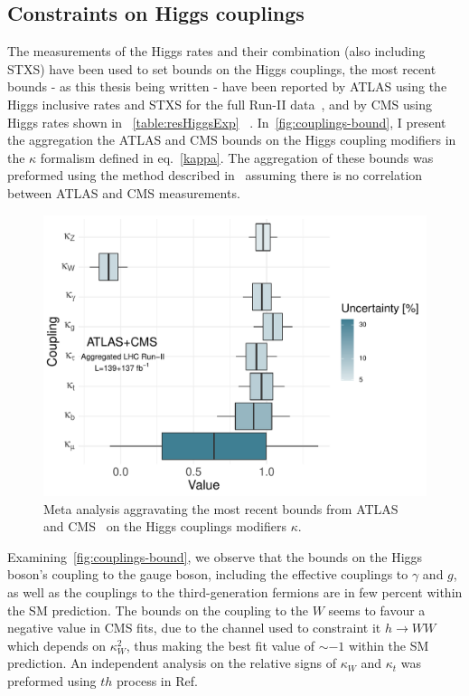 \subsection{Constraints on Higgs couplings}
The measurements of the Higgs rates and their combination (also including STXS) have been used to set bounds on the Higgs couplings, the most recent bounds - as this thesis being written - have been reported by ATLAS using the Higgs inclusive rates and STXS for the full Run-II data~\cite{ATLAS2021vrm}, and  by CMS using Higgs rates shown in ~\autoref{table:resHiggsExp} ~\cite{CMS:2020gsy}. In~\autoref{fig:couplings-bound}, I present the aggregation the ATLAS and CMS bounds on the Higgs coupling modifiers in the $\kappa$ formalism defined in eq.~\eqref{kappa}. The aggregation of these bounds was preformed using the method described in~\cite{BHHR} assuming there is no correlation between ATLAS and CMS measurements.  
\begin{figure}[htb!]
	\begin{center}
		\includegraphics[height=0.35\textheight]{figures/agg_higgs_couplings}
		\caption{Meta analysis aggravating the most recent bounds from ATLAS~\cite{ATLAS2021vrm} and CMS~\cite{CMS:2020gsy} on the Higgs couplings modifiers $\kappa$.   }	
		\label{fig:couplings-bound}
	\end{center}
\end{figure}
\par Examining~\autoref{fig:couplings-bound}, we observe that the bounds on the Higgs boson's coupling to the gauge boson, including the effective couplings to $\gamma$ and $g$, as well as the couplings to the third-generation fermions are in few percent within the SM prediction. The bounds on the coupling to the $W$ seems to  favour a negative value in CMS fits, due to the channel used to constraint it $ h \to WW$ which depends on $ \kappa_W^2$, thus making the best fit value of $ \sim -1$ within the SM prediction. An independent analysis on the relative signs of $\kappa_W$ and $\kappa_t$ was preformed using $th$ process in Ref.~\cite{CMS:2018jeh}
